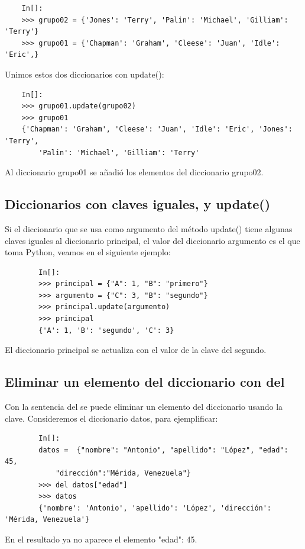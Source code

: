 \begin{lstlisting}
	In[]:
	>>> grupo02 = {'Jones': 'Terry', 'Palin': 'Michael', 'Gilliam': 'Terry'}
	>>> grupo01 = {'Chapman': 'Graham', 'Cleese': 'Juan', 'Idle': 'Eric',}
\end{lstlisting}

Unimos estos dos diccionarios con  {\ttfamily update()}: 		
\begin{lstlisting}
	In[]:			
	>>> grupo01.update(grupo02)
	>>> grupo01
	{'Chapman': 'Graham', 'Cleese': 'Juan', 'Idle': 'Eric', 'Jones': 'Terry',
		'Palin': 'Michael', 'Gilliam': 'Terry'
	\end{lstlisting}
	Al diccionario  grupo01 se añadió los elementos del diccionario grupo02.
	
	\subsection{Diccionarios con claves iguales, y update()}
	
	
	Si el diccionario que se usa como argumento del método {\ttfamily update()} tiene algunas claves iguales al diccionario  principal, el valor del diccionario argumento es el que toma Python, veamos en el siguiente ejemplo:
	\begin{lstlisting}
		In[]:		
		>>> principal = {"A": 1, "B": "primero"}
		>>> argumento = {"C": 3, "B": "segundo"}
		>>> principal.update(argumento)
		>>> principal
		{'A': 1, 'B': 'segundo', 'C': 3}
	\end{lstlisting}
	El diccionario principal se actualiza con el  valor de la clave del segundo. 
	
	\subsection{Eliminar un elemento del diccionario con {\ttfamily del}}
	
	Con la sentencia {\ttfamily del}  se puede eliminar un elemento del diccionario usando la clave. 
	Consideremos el diccionario {\ttfamily datos}, para ejemplificar:
	
	\begin{lstlisting}
		In[]:	
		datos =  {"nombre": "Antonio", "apellido": "López", "edad": 45, 
			"dirección":"Mérida, Venezuela"}
		>>> del datos["edad"]
		>>> datos
		{'nombre': 'Antonio', 'apellido': 'López', 'dirección': 'Mérida, Venezuela'}
	\end{lstlisting}
	En el resultado ya no aparece el elemento {\ttfamily "{}edad{}"{}: 45}.
	
